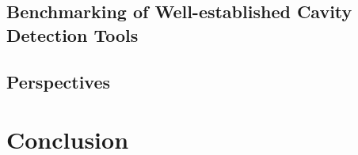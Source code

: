 \documentclass[Ingles]{phdthesis}
\begin{document}


\section{Benchmarking of Well-established Cavity Detection Tools}

\section{Perspectives}



\chapter{Conclusion}
\end{document}
